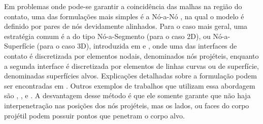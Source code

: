 \documentclass[Tese.tex]{subfiles}
\begin{document}
Em problemas onde pode-se garantir a coincidência das malhas na região do contato, uma das formulações mais simples é a Nó-a-Nó \cite{wriggers2006computational}, na qual o modelo é definido por pares de nós devidamente alinhados. Para o caso mais geral, uma estratégia comum é a do tipo Nó-a-Segmento (para o caso 2D), ou Nó-a-Superfície (para o caso 3D), introduzida em  e , onde uma das interfaces de contato é discretizada por elementos nodais, denominados nós projéteis, enquanto a segunda interface é discretizada por elementos de linhas curvas ou de superfície, denominadas superfícies alvos. Explicações detalhadas sobre a formulação podem ser encontradas em .
Outros exemplos de trabalhos que utilizam essa abordagem são , ,  e . A desvantagem desse método é que ele somente garante que não haja interpenetração nas posições dos nós projéteis, mas os lados, ou faces do corpo projétil podem possuir pontos que penetram o corpo alvo.



\end{document}
